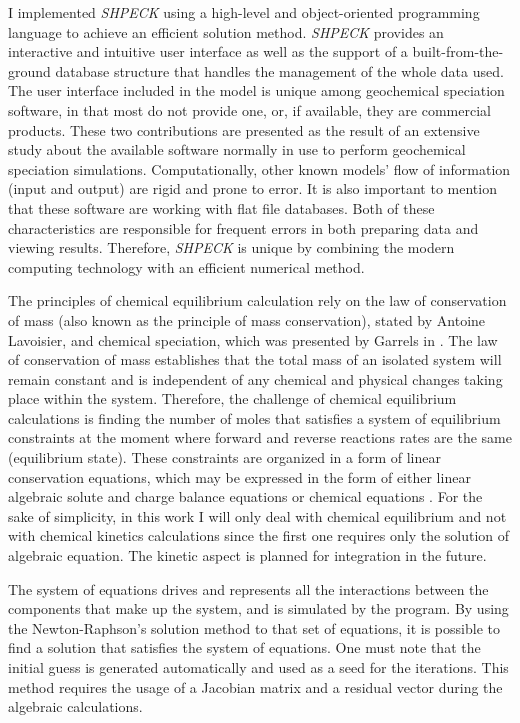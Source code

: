 I implemented \emph{SHPECK} using a high-level and object-oriented programming language to achieve an efficient solution method. \emph{SHPECK} provides an interactive and intuitive user interface as well as the support of a built-from-the-ground database structure that handles the management of the whole data used. The user interface included in the model is unique among geochemical speciation software, in that most do not provide one, or, if available, they are commercial products. These two contributions are presented as the result of an extensive study about the available software normally in use to perform geochemical speciation simulations. Computationally, other known models’ flow of information (input and output) are rigid and prone to error. It is also important to mention that these software are working with flat file databases. Both of these characteristics are responsible for frequent errors in both preparing data and viewing results. Therefore, \emph{SHPECK} is unique by combining the modern computing technology with an efficient numerical method.


The principles of chemical equilibrium calculation rely on the law of conservation of mass (also known as the principle of mass conservation), stated by Antoine Lavoisier, and chemical speciation, which was presented by Garrels in \cite{Garrels:65}. 
The law of conservation of mass establishes that the total mass of an isolated system will remain constant and is independent of any chemical and physical changes taking place within the system. Therefore, the challenge of chemical equilibrium calculations is finding the number of moles that satisfies a system of equilibrium constraints at the moment where forward and reverse reactions rates are the same (equilibrium state). 
These constraints are organized in a form of linear conservation equations, which may be expressed in the form of either linear algebraic solute and charge balance equations or chemical equations \cite{SmithMissen83}. For the sake of simplicity, in this work I will only deal with chemical equilibrium and not with chemical kinetics calculations since the first one requires only the solution of algebraic equation. The kinetic aspect is planned for integration in the future.


The system of equations drives and represents all the interactions between the components that make up the system, and is simulated by the program. By using the Newton-Raphson's solution method to that set of equations, it is possible to find a solution that satisfies the system of equations.  One must note that the initial guess is generated automatically and used as a seed for the iterations. 
This method requires the usage of a Jacobian matrix and a residual vector during the algebraic calculations. 


